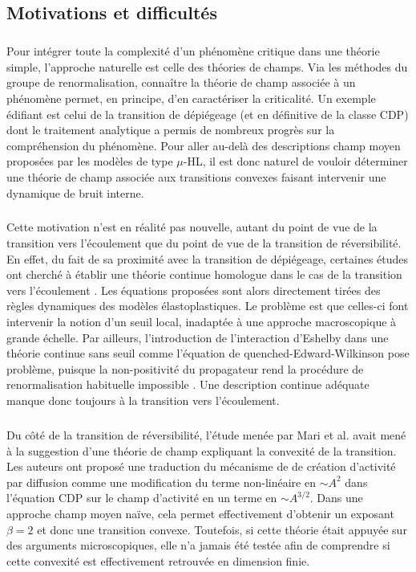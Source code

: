 \label{sec:eqChampConv}

\subsection{Motivations et difficultés}

\subparagraph{}Pour intégrer toute la complexité d'un phénomène critique dans une théorie simple, l'approche naturelle est celle des théories de champs. Via les méthodes du groupe de renormalisation, connaître la théorie de champ associée à un phénomène permet, en principe, d'en caractériser la criticalité. Un exemple édifiant est celui de la transition de dépiégeage (et en définitive de la classe CDP) dont le traitement analytique a permis de nombreux progrès sur la compréhension du phénomène. Pour aller au-delà des descriptions champ moyen proposées par les modèles de type $\mu$-HL, il est donc naturel de vouloir déterminer une théorie de champ associée aux transitions convexes faisant intervenir une dynamique de bruit interne.

\subparagraph{}Cette motivation n'est en réalité pas nouvelle, autant du point de vue de la transition vers l'écoulement que du point de vue de la transition de réversibilité. En effet, du fait de sa proximité avec la transition de dépiégeage, certaines études ont cherché à établir une théorie continue homologue dans le cas de la transition vers l'écoulement \cite{tyukodi_depinning_2016, weiss_finite_2014}. Les équations proposées sont alors directement tirées des règles dynamiques des modèles élastoplastiques. Le problème est que celles-ci font intervenir la notion d'un seuil local, inadaptée à une approche macroscopique à grande échelle. Par ailleurs, l'introduction de l'interaction d'Eshelby dans une théorie continue sans seuil comme l'équation de quenched-Edward-Wilkinson pose problème, puisque la non-positivité du propagateur rend la procédure de renormalisation habituelle impossible \cite{wiese_blabla}. Une description continue adéquate manque donc toujours à la transition vers l'écoulement.

\subparagraph{}Du côté de la transition de réversibilité, l'étude menée par Mari et al. \cite{mari_absorbing_2022} avait mené à la suggestion d'une théorie de champ expliquant la convexité de la transition. Les auteurs ont proposé une traduction du mécanisme de de création d'activité par diffusion comme une modification du terme non-linéaire en $\sim A^2$ dans l'équation CDP sur le champ d'activité en un terme en $\sim A^{3/2}$. Dans une approche champ moyen naïve, cela permet effectivement d'obtenir un exposant $\beta = 2$ et donc une transition convexe. Toutefois, si cette théorie était appuyée sur des arguments microscopiques, elle n'a jamais été testée afin de comprendre si cette convexité est effectivement retrouvée en dimension finie.

